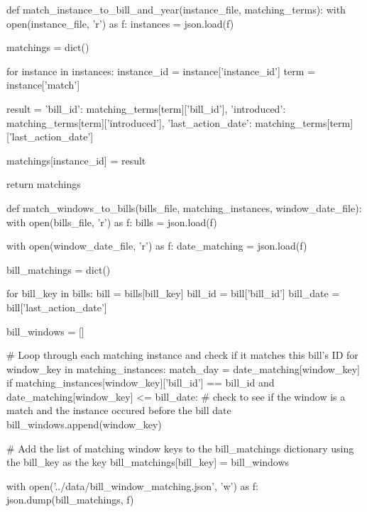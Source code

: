 
\begin{pyin}
def match_instance_to_bill_and_year(instance_file, matching_terms):
    with open(instance_file, 'r') as f:
        instances = json.load(f)

    matchings = dict()

    for instance in instances:
        instance_id = instance['instance_id']
        term = instance['match']

        result = {'bill_id': matching_terms[term]['bill_id'],
                  'introduced': matching_terms[term]['introduced'],
                  'last_action_date': matching_terms[term]['last_action_date']}

        matchings[instance_id] = result

    return matchings
\end{pyin}

\begin{pyin}
def match_windows_to_bills(bills_file, matching_instances, window_date_file):
    with open(bills_file, 'r') as f:
        bills = json.load(f)

    with open(window_date_file, 'r') as f:
        date_matching = json.load(f)

    bill_matchings = dict()

    for bill_key in bills:
        bill = bills[bill_key]
        bill_id = bill['bill_id']
        bill_date = bill['last_action_date']

        bill_windows = []

        # Loop through each matching instance and check if it matches this bill's ID
        for window_key in matching_instances:
            match_day = date_matching[window_key]
            if matching_instances[window_key]['bill_id'] == bill_id and date_matching[window_key] <= bill_date:  # check to see if the window is a match and the instance occured before the bill date
                bill_windows.append(window_key)


        # Add the list of matching window keys to the bill_matchings dictionary using the bill_key as the key
        bill_matchings[bill_key] = bill_windows

    with open('../data/bill_window_matching.json', 'w') as f:
        json.dump(bill_matchings, f)
\end{pyin}

